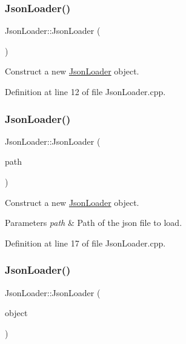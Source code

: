 \subsubsection{\texorpdfstring{Json\+Loader()}{JsonLoader()}\hspace{0.1cm}{\footnotesize\ttfamily [1/3]}}
{\footnotesize\ttfamily Json\+Loader\+::\+Json\+Loader (\begin{DoxyParamCaption}{ }\end{DoxyParamCaption})}



Construct a new \hyperlink{classtls_1_1_json_loader}{Json\+Loader} object. 



Definition at line 12 of file Json\+Loader.\+cpp.

\mbox{\label{classtls_1_1_json_loader_ad6ec799a31fbae8ea01a9d6c278ad6e3}} 
\subsubsection{\texorpdfstring{Json\+Loader()}{JsonLoader()}\hspace{0.1cm}{\footnotesize\ttfamily [2/3]}}
{\footnotesize\ttfamily Json\+Loader\+::\+Json\+Loader (\begin{DoxyParamCaption}\item[{const std\+::filesystem\+::path \&}]{path }\end{DoxyParamCaption})}



Construct a new \hyperlink{classtls_1_1_json_loader}{Json\+Loader} object. 


\begin{DoxyParams}{Parameters}
{\em path} & Path of the json file to load. \\
\hline
\end{DoxyParams}


Definition at line 17 of file Json\+Loader.\+cpp.

\mbox{\label{classtls_1_1_json_loader_a0826d5c9480c38d010fe580101d916e0}} 
\subsubsection{\texorpdfstring{Json\+Loader()}{JsonLoader()}\hspace{0.1cm}{\footnotesize\ttfamily [3/3]}}
{\footnotesize\ttfamily Json\+Loader\+::\+Json\+Loader (\begin{DoxyParamCaption}\item[{const \hyperlink{namespacetls_a4e8d32383e204ee25990db65651ea712}{json} \&}]{object }\end{DoxyParamCaption})}



